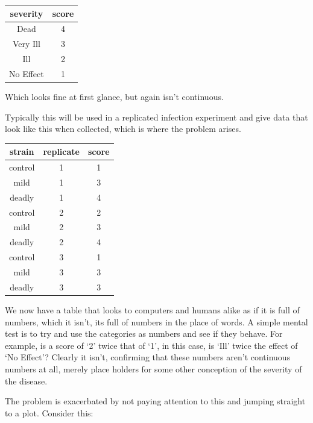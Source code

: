 \documentclass[
]{book}
\newenvironment{Shaded}{\begin{snugshade}}{\end{snugshade}}
\newcommand{\KeywordTok}[1]{\textcolor[rgb]{0.13,0.29,0.53}{\textbf{#1}}}
\newcommand{\NormalTok}[1]{#1}
\newcommand{\OperatorTok}[1]{\textcolor[rgb]{0.81,0.36,0.00}{\textbf{#1}}}
\newcommand{\StringTok}[1]{\textcolor[rgb]{0.31,0.60,0.02}{#1}}
\begin{document}
\begin{tabular}{c|c}
\hline
severity & score\\
\hline
Dead & 4\\
\hline
Very Ill & 3\\
\hline
Ill & 2\\
\hline
No Effect & 1\\
\hline
\end{tabular}

Which looks fine at first glance, but again isn't continuous.

Typically this will be used in a replicated infection experiment and give data that look like this when collected, which is where the problem arises.

\begin{Shaded}
\end{Shaded}

\begin{tabular}{c|c|c}
\hline
strain & replicate & score\\
\hline
control & 1 & 1\\
\hline
mild & 1 & 3\\
\hline
deadly & 1 & 4\\
\hline
control & 2 & 2\\
\hline
mild & 2 & 3\\
\hline
deadly & 2 & 4\\
\hline
control & 3 & 1\\
\hline
mild & 3 & 3\\
\hline
deadly & 3 & 3\\
\hline
\end{tabular}

We now have a table that looks to computers and humans alike as if it is full of numbers, which it isn't, its full of numbers in the place of words. A simple mental test is to try and use the categories as numbers and see if they behave. For example, is a score of `2' twice that of `1', in this case, is `Ill' twice the effect of `No Effect'? Clearly it isn't, confirming that these numbers aren't continuous numbers at all, merely place holders for some other conception of the severity of the disease.

The problem is exacerbated by not paying attention to this and jumping straight to a plot. Consider this:
\end{document}
